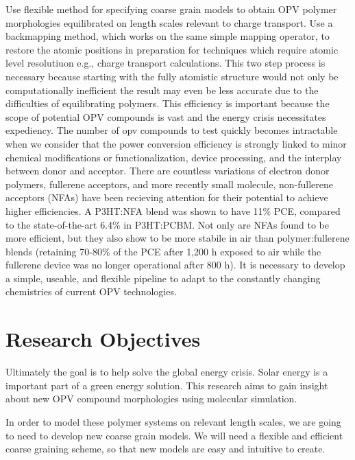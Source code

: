 Use flexible method for specifying coarse grain models to obtain OPV polymer morphologies equilibrated on length scales relevant to charge transport.
Use a backmapping method, which works on the same simple mapping operator, to restore the atomic positions in preparation for techniques which require atomic level resolutiuon e.g., charge transport calculations.
This two step process is necessary because starting with the fully atomistic structure would not only be computationally inefficient the result may even be less accurate due to the difficulties of equilibrating polymers\cite{Gartner2019a}.
This efficiency is important because the scope of potential OPV compounds is vast and the energy crisis necessitates expediency.
The number of opv compounds to test quickly becomes intractable when we consider that the power conversion efficiency is strongly linked to minor chemical modifications or functionalization, device processing, and the interplay between donor and acceptor\cite{Mazzio2015,Swick2019a}.
There are countless variations of electron donor polymers, fullerene acceptors, and more recently small molecule, non-fullerene acceptors (NFAs) have been recieving attention for their potential to achieve higher efficiencies\cite{Dou2013}.
A P3HT:NFA blend was shown to have 11\% PCE, compared to the state-of-the-art 6.4\% in P3HT:PCBM\cite{Baran2017}.
Not only are NFAs found to be more efficient, but they also show to be more stabile in air than polymer:fullerene blends (retaining 70-80\% of the PCE after 1,200 h exposed to air while the fullerene device was no longer operational after 800 h)\cite{Baran2017}.
It is necessary to develop a simple, useable, and flexible pipeline to adapt to the constantly changing chemistries of current OPV technologies. %

\section*{Research Objectives}

Ultimately the goal is to help solve the global energy crisis. 
Solar energy is a important part of a green energy solution.
This research aims to gain insight about new OPV compound morphologies using molecular simulation.

In order to model these polymer systems on relevant length scales, we are going to need to develop new coarse grain models.
We will need a flexible and efficient coarse graining scheme, so that new models are easy and intuitive to create.

